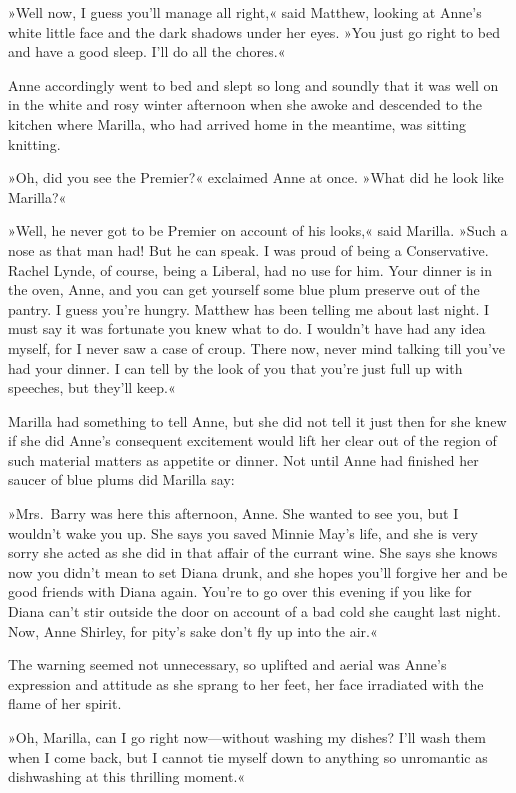 »Well now, I guess you'll manage all right,« said Matthew, looking at Anne's white little face and the dark shadows under her eyes. »You just go right to bed and have a good sleep. I'll do all the chores.«

Anne accordingly went to bed and slept so long and soundly that it was well on in the white and rosy winter afternoon when she awoke and descended to the kitchen where Marilla, who had arrived home in the meantime, was sitting knitting.

»Oh, did you see the Premier?« exclaimed Anne at once. »What did he look like Marilla?«

»Well, he never got to be Premier on account of his looks,« said Marilla. »Such a nose as that man had! But he can speak. I was proud of being a Conservative. Rachel Lynde, of course, being a Liberal, had no use for him. Your dinner is in the oven, Anne, and you can get yourself some blue plum preserve out of the pantry. I guess you're hungry. Matthew has been telling me about last night. I must say it was fortunate you knew what to do. I wouldn't have had any idea myself, for I never saw a case of croup. There now, never mind talking till you've had your dinner. I can tell by the look of you that you're just full up with speeches, but they'll keep.«

Marilla had something to tell Anne, but she did not tell it just then for she knew if she did Anne's consequent excitement would lift her clear out of the region of such material matters as appetite or dinner. Not until Anne had finished her saucer of blue plums did Marilla say:

»Mrs.~Barry was here this afternoon, Anne. She wanted to see you, but I wouldn't wake you up. She says you saved Minnie May's life, and she is very sorry she acted as she did in that affair of the currant wine. She says she knows now you didn't mean to set Diana drunk, and she hopes you'll forgive her and be good friends with Diana again. You're to go over this evening if you like for Diana can't stir outside the door on account of a bad cold she caught last night. Now, Anne Shirley, for pity's sake don't fly up into the air.«

The warning seemed not unnecessary, so uplifted and aerial was Anne's expression and attitude as she sprang to her feet, her face irradiated with the flame of her spirit.

»Oh, Marilla, can I go right now—without washing my dishes? I'll wash them when I come back, but I cannot tie myself down to anything so unromantic as dishwashing at this thrilling moment.«


